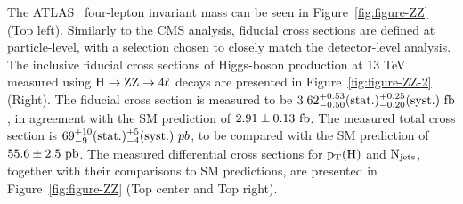\documentclass[10pt]{article}
\begin{document}
The ATLAS~\cite{ATLAS-ZZ} four-lepton invariant mass can be seen in
Figure~\ref{fig:figure-ZZ} (Top left). Similarly to the CMS analysis, fiducial
cross sections are defined at particle-level, with a selection chosen
to closely match the detector-level analysis. The inclusive fiducial cross
sections of Higgs-boson production at 13 TeV measured using
${\rm H \to ZZ \to 4\ell}$ decays are presented in Figure~\ref{fig:figure-ZZ-2}
(Right). The fiducial cross section is measured
to be ${\rm 3.62_{-0.50}^{+0.53}(stat.)_{-0.20}^{+0.25}(syst.)~fb}$, in agreement
with the SM prediction of ${\rm 2.91 \pm 0.13~fb}$. The measured total cross section is
${\rm 69_{-9}^{+10}(stat.)_{-4}^{+5}(syst.)}~pb$, to be compared with the
SM prediction of ${\rm 55.6 \pm 2.5~pb}$. The measured differential cross sections
for ${\rm p_T(H)}$ and ${\rm N_{jets}}$, together with their comparisons to SM
predictions, are presented in Figure~\ref{fig:figure-ZZ} (Top center and Top right).
\end{document}
